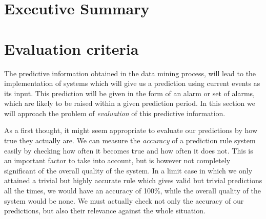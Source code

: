 \documentclass[a4paper,12pt]{article}
\begin{document}
\newcommand\litem[1]{\item{\bfseries #1 }}
\renewcommand{\arraystretch}{1.5} %

\newcommand\headcell[1]{%
  \multicolumn{1}{c|}{\cellcolor{MidnightBlue}\bfseries\sffamily\textcolor{white}{#1}}
}

%

\onehalfspacing



\section*{Executive Summary}


\newpage
\tableofcontents %
\cleardoublepage
{} %
\listoffigures %

\cleardoublepage
{} %
\listoftables %
\cleardoublepage

\setcounter{page}{1}

\section{Evaluation criteria}
The predictive information obtained in the data mining process, will lead to the implementation of systems which will give us a prediction using current events as its input. This prediction will be given in the form of an alarm or set of alarms, which are likely to be raised within a given prediction period. In this section we will approach the problem of \emph{evaluation} of this predictive information.

As a first thought, it might seem appropriate to evaluate our predictions by how true they actually are. We can measure the \emph{accuracy} of a prediction rule system easily by checking how often it becomes true and how often it does not. This is an important factor to take into account, but is however not completely significant of the overall quality of the system. In a limit case in which we only attained a trivial but highly accurate rule which gives valid but trivial predictions all the times, we would have an accuracy of 100\%, while the overall quality of the system would be none. We must actually check not only the accuracy of our predictions, but also their relevance against the whole situation.
\end{document}
